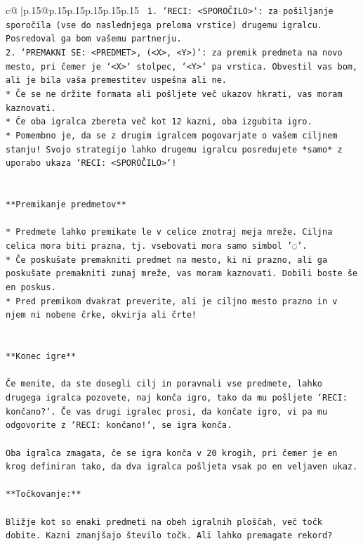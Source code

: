 \documentclass{article}
\begin{document}
{\begin{supertabular}{c@{$\;$}|p{.15\linewidth}@{}p{.15\linewidth}p{.15\linewidth}p{.15\linewidth}p{.15\linewidth}p{.15\linewidth}}
{{{\texttt{ 1. `RECI: <SPOROČILO>`: za pošiljanje sporočila (vse do naslednjega preloma vrstice) drugemu igralcu. Posredoval ga bom vašemu partnerju.} \\
\texttt{2. `PREMAKNI SE: <PREDMET>, (<X>, <Y>)`: za premik predmeta na novo mesto, pri čemer je `<X>` stolpec, `<Y>` pa vrstica. Obvestil vas bom, ali je bila vaša premestitev uspešna ali ne.} \\
\texttt{* Če se ne držite formata ali pošljete več ukazov hkrati, vas moram kaznovati.} \\
\texttt{* Če oba igralca zbereta več kot 12 kazni, oba izgubita igro.} \\
\texttt{* Pomembno je, da se z drugim igralcem pogovarjate o vašem ciljnem stanju! Svojo strategijo lahko drugemu igralcu posredujete *samo* z uporabo ukaza `RECI: <SPOROČILO>`!} \\
\\ 
\\ 
\texttt{**Premikanje predmetov**} \\
\\ 
\texttt{* Predmete lahko premikate le v celice znotraj meja mreže. Ciljna celica mora biti prazna, tj. vsebovati mora samo simbol '◌'.} \\
\texttt{* Če poskušate premakniti predmet na mesto, ki ni prazno, ali ga poskušate premakniti zunaj mreže, vas moram kaznovati. Dobili boste še en poskus.} \\
\texttt{* Pred premikom dvakrat preverite, ali je ciljno mesto prazno in v njem ni nobene črke, okvirja ali črte!} \\
\\ 
\\ 
\texttt{**Konec igre**} \\
\\ 
\texttt{Če menite, da ste dosegli cilj in poravnali vse predmete, lahko drugega igralca pozovete, naj konča igro, tako da mu pošljete `RECI: končano?`. Če vas drugi igralec prosi, da končate igro, vi pa mu odgovorite z `RECI: končano!`, se igra konča.} \\
\\ 
\texttt{Oba igralca zmagata, če se igra konča v 20 krogih, pri čemer je en krog definiran tako, da dva igralca pošljeta vsak po en veljaven ukaz.} \\
\\ 
\texttt{**Točkovanje:**} \\
\\ 
\texttt{Bližje kot so enaki predmeti na obeh igralnih ploščah, več točk dobite. Kazni zmanjšajo število točk. Ali lahko premagate rekord?} \\
}}}
\end{supertabular}}
\end{document}
